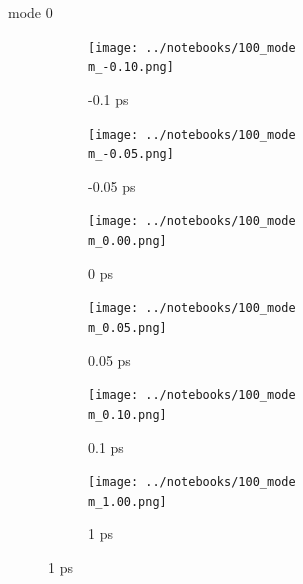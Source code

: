\documentclass{beamer}
\begin{document}
\newcommand\m{0}
\newcommand\w{0.32}
\begin{frame}{mode \m}
	\begin{figure}
		\centering
		\begin{subfigure}[b]{\w\textwidth}
			\centering
			\texttt{[image: ../notebooks/100\_mode\\m\_-0.10.png]}
			\caption{-0.1 ps}
			\label{fig:}
		\end{subfigure}
		\begin{subfigure}[b]{\w\textwidth}
			\centering
			\texttt{[image: ../notebooks/100\_mode\\m\_-0.05.png]}
			\caption{-0.05 ps}
			\label{fig:}
		\end{subfigure}
		\begin{subfigure}[b]{\w\textwidth}
			\centering
			\texttt{[image: ../notebooks/100\_mode\\m\_0.00.png]}
			\caption{0 ps}
			\label{fig:}
		\end{subfigure}
		\begin{subfigure}[b]{\w\textwidth}
			\centering
			\texttt{[image: ../notebooks/100\_mode\\m\_0.05.png]}
			\caption{0.05 ps}
			\label{fig:}
		\end{subfigure}
		\begin{subfigure}[b]{\w\textwidth}
			\centering
			\texttt{[image: ../notebooks/100\_mode\\m\_0.10.png]}
			\caption{0.1 ps}
			\label{fig:}
		\end{subfigure}
		\begin{subfigure}[b]{\w\textwidth}
			\centering
			\texttt{[image: ../notebooks/100\_mode\\m\_1.00.png]}
			\caption{1 ps}
			\label{fig:}
		\end{subfigure}
	\end{figure}
\end{frame}
\end{document}
